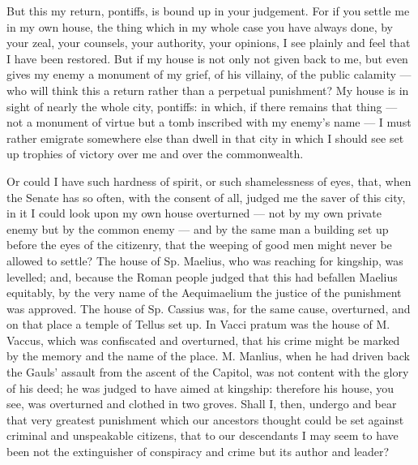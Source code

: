  But this my return, pontiffs, is bound up in your judgement. For if you settle me in my own house, the thing which in my whole case you have always done, by your zeal, your counsels, your authority, your opinions, I see plainly and feel that I have been restored. But if my house is not only not given back to me, but even gives my enemy a monument of my grief, of his villainy, of the public calamity --- who will think this a return rather than a perpetual punishment? My house is in sight of nearly the whole city, pontiffs: in which, if there remains that thing --- not a monument of virtue but a tomb inscribed with my enemy's name --- I must rather emigrate somewhere else than dwell in that city in which I should see set up trophies of victory over me and over the commonwealth.

 Or could I have such hardness of spirit, or such shamelessness of eyes, that, when the Senate has so often, with the consent of all, judged me the saver of this city, in it I could look upon my own house overturned --- not by my own private enemy but by the common enemy --- and by the same man a building set up before the eyes of the citizenry, that the weeping of good men might never be allowed to settle? The house of Sp. Maelius, who was reaching for kingship, was levelled; and, because the Roman people judged that this had befallen Maelius equitably, by the very name of the Aequimaelium the justice of the punishment was approved. The house of Sp. Cassius was, for the same cause, overturned, and on that place a temple of Tellus set up. In Vacci pratum was the house of M. Vaccus, which was confiscated and overturned, that his crime might be marked by the memory and the name of the place. M. Manlius, when he had driven back the Gauls' assault from the ascent of the Capitol, was not content with the glory of his deed; he was judged to have aimed at kingship: therefore his house, you see, was overturned and clothed in two groves. Shall I, then, undergo and bear that very greatest punishment which our ancestors thought could be set against criminal and unspeakable citizens, that to our descendants I may seem to have been not the extinguisher of conspiracy and crime but its author and leader?

